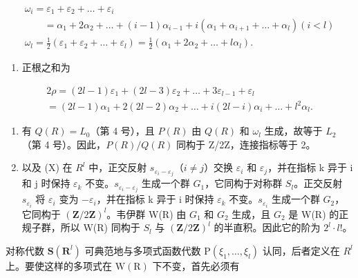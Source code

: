 \[
\begin{array}{l} \omega_ {i} = \varepsilon_ {1} + \varepsilon_ {2} + \dots + \varepsilon_ {i} \\ \qquad = \alpha_ {1} + 2 \alpha_ {2} + \dots + (i - 1) \alpha_ {i - 1} + i (\alpha_ {1} + \alpha_ {i + 1} + \dots + \alpha_ {l}) (i <   l) \\ \omega_ {l} = \frac {1}{2} (\varepsilon_ {1} + \varepsilon_ {2} + \dots + \varepsilon_ {l}) = \frac {1}{2} (\alpha_ {1} + 2 \alpha_ {2} + \dots + l \alpha_ {l}). \end{array}
\]

\begin{enumerate}
\def\labelenumi{(\Roman{enumi})}
\setcounter{enumi}{6}
\tightlist
\item
  正根之和为
\end{enumerate}

\[
\begin{array}{l} 2 \rho = (2 l - 1) \varepsilon_ {1} + (2 l - 3) \varepsilon_ {2} + \dots + 3 \varepsilon_ {l - 1} + \varepsilon_ {l} \\ = (2 l - 1) \alpha_ {1} + 2 (2 l - 2) \alpha_ {2} + \dots + i (2 l - i) \alpha_ {i} + \dots + l ^ {2} \alpha_ {l}. \end{array}
\]

\begin{enumerate}
\def\labelenumi{(\Roman{enumi})}
\setcounter{enumi}{7}
\item
  有 \(Q(R) = L_{0}\)（第 4 号），且 \(P(R)\) 由 \(Q(R)\) 和 \(\omega_{l}\) 生成，故等于 \(L_{2}\)（第 4 号）。因此，\(P(R)/Q(R)\) 同构于 Z/2Z，连接指标等于 2。
\item
  以及 (X) 在 \(R^{l}\) 中，正交反射 \(s_{\varepsilon_{i}-\varepsilon_{j}}\)（\(i \neq j\)）交换 \(\varepsilon_{i}\) 和 \(\varepsilon_{j}\)，并在指标 k 异于 i 和 j 时保持 \(\varepsilon_{k}\) 不变。\(s_{\varepsilon_{i}-\varepsilon_{j}}\) 生成一个群 \(G_{1}\)，它同构于对称群 \(S_{l}\)。正交反射 \(s_{\varepsilon_{i}}\) 将 \(\varepsilon_{i}\) 变为 \(-\varepsilon_{i}\)，并在指标 k 异于 i 时保持 \(\varepsilon_{k}\) 不变。\(s_{\varepsilon_{i}}\) 生成一个群 \(G_{2}\)，它同构于 \((\mathbf{Z}/2\mathbf{Z})^{l}\)。韦伊群 W(R) 由 \(G_{1}\) 和 \(G_{2}\) 生成，且 \(G_{2}\) 是 W(R) 的正规子群，所以 W(R) 同构于 \(S_{l}\) 与 \((\mathbf{Z}/2\mathbf{Z})^{l}\) 的半直积。因此它的阶为 \(2^{l}\cdot l!\)。
\end{enumerate}

对称代数 \(\mathbf{S}(\mathbf{R}^{l})\) 可典范地与多项式函数代数 \(\mathrm{P}(\xi_{1},\ldots,\xi_{l})\) 认同，后者定义在 \(R^{l}\) 上。要使这样的多项式在 \(\mathrm{W}(\mathrm{R})\) 下不变，首先必须有

